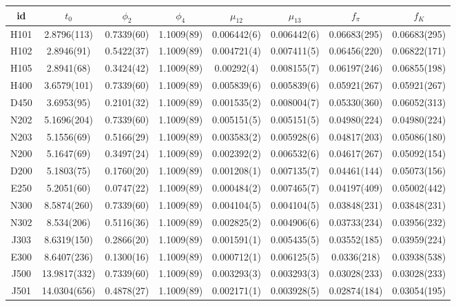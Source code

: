\newpage

\begin{sidewaystable}
\begin{center}
    \begin{tabular}{c c c c c c c c}
id & $t_0$ & $\phi_2$ & $\phi_4$ & $\mu_{12}$ & $\mu_{13}$ & $f_{\pi}$ & $f_K$ \\
\toprule
H101 & 2.8796(113) & 0.7339(60) & 1.1009(89) & 0.006442(6) & 0.006442(6) & 0.06683(295) & 0.06683(295) \\
H102 & 2.8946(91) & 0.5422(37) & 1.1009(89) & 0.004721(4) & 0.007411(5) & 0.06456(220) & 0.06822(171) \\
H105 & 2.8941(68) & 0.3424(42) & 1.1009(89) & 0.00292(4) & 0.008155(7) & 0.06197(246) & 0.06855(198) \\
\midrule
H400 & 3.6579(101) & 0.7339(60) & 1.1009(89) & 0.005839(6) & 0.005839(6) & 0.05921(267) & 0.05921(267) \\
D450 & 3.6953(95) & 0.2101(32) & 1.1009(89) & 0.001535(2) & 0.008004(7) & 0.05330(360) & 0.06052(313) \\
\midrule
N202 & 5.1696(204) & 0.7339(60) & 1.1009(89) & 0.005151(5) & 0.005151(5) & 0.04980(224) & 0.04980(224) \\
N203 & 5.1556(69) & 0.5166(29) & 1.1009(89) & 0.003583(2) & 0.005928(6) & 0.04817(203) & 0.05086(180) \\
N200 & 5.1647(69) & 0.3497(24) & 1.1009(89) & 0.002392(2) & 0.006532(6) & 0.04617(267) & 0.05092(154) \\
D200 & 5.1803(75) & 0.1760(20) & 1.1009(89) & 0.001208(1) & 0.007135(7) & 0.04461(144) & 0.05073(156) \\
E250 & 5.2051(60) & 0.0747(22) & 1.1009(89) & 0.000484(2) & 0.007465(7) & 0.04197(409) & 0.05002(442) \\
\midrule
N300 & 8.5874(260) & 0.7339(60) & 1.1009(89) & 0.004104(5) & 0.004104(5) & 0.03848(231) & 0.03848(231) \\
N302 & 8.534(206) & 0.5116(36) & 1.1009(89) & 0.002825(2) & 0.004906(6) & 0.03733(234) & 0.03956(232) \\
J303 & 8.6319(150) & 0.2866(20) & 1.1009(89) & 0.001591(1) & 0.005435(5) & 0.03552(185) & 0.03959(224) \\
E300 & 8.6407(236) & 0.1300(16) & 1.1009(89) & 0.000712(1) & 0.006125(5) & 0.0336(218) & 0.03938(538) \\
\midrule
J500 & 13.9817(332) & 0.7339(60) & 1.1009(89) & 0.003293(3) & 0.003293(3) & 0.03028(233) & 0.03028(233) \\
J501 & 14.0304(656) & 0.4878(27) & 1.1009(89) & 0.002171(1) & 0.003928(5) & 0.02874(184) & 0.03054(195) \\

\end{tabular}
\end{center}
\end{sidewaystable}
